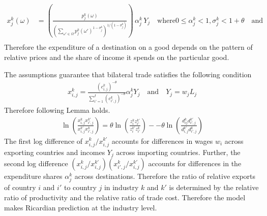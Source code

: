 \begin{align*}
x^k_{j}(\omega) &=  \left(\frac{ p^k_{j}(\omega) }  {  \left( \sum_{\omega' \in \Omega} {p_j^k (\omega')}^{1-\sigma_j^k } \right)^{1/(1-\sigma_j^k) }}    \right)\, \alpha^k_j \,Y_j \quad \text{where} 0 \leq \alpha_j^k < 1,\sigma_{j}^k<1+\theta \quad \text{and} \, \\
\end{align*}
Therefore the expenditure of a destination on a good depends on the pattern of relative prices and the share of income it spends on the particular good. \par
The assumptions guarantee that bilateral trade satisfies the following condition  \begin{align} x^k_{i,j}= \frac{(c^k_{i,j})^{ -\theta} } {\sum_{i'=1}^{I}(c^k_{i',j})^{-\theta } }  \alpha^k_j Y_j \quad \text{and}\quad Y_j=w_j  L_j \end{align}
Therefore following Lemma holds. \begin{align} \ln \left( \frac{{x}_{i,j}^k {x}^{k'}_{i',j}}{{x}_{i,j}^{k'} {x}^{k}_{i',j}} \right) = \theta \ln \left( \frac{{z}_{i}^k {z}^{k'}_{i'}}{{z}_{i}^{k'} {z}^{k}_{i'}} \right)--\theta \ln \left( \frac{ d_{ij}^k d^{k'}_{i',j}}{d_{i,j}^{k'} {d}^{k}_{i',j}} \right) \end{align}
The first log difference of ${x_{i,j}^k} /x_{i,j}^{k'}$ accounts for differences in wages $w_i$ across exporting countries and incomes $Y_j$ across importing countries. Further, the second log difference $\left({x_{i,j}^k} /x_{i,j}^{k'} \right)  \left({x_{i',j}^k} /x_{i,j}^{k'} \right) $ accounts for differences in the expenditure shares $\alpha^k_j$ across destinations. Therefore the ratio of relative exports of country $i$ and $i'$ to country $j$ in industry $k$ and $k'$ is determined by the relative ratio of productivity and the relative ratio of trade cost. Therefore the model  makes Ricardian prediction at the industry level. 

